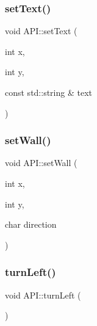 \mbox{\label{class_a_p_i_a25a489520b0b69b7a0b1870cf350f654}} 
\subsubsection{\texorpdfstring{set\+Text()}{setText()}}
{\footnotesize\ttfamily void A\+P\+I\+::set\+Text (\begin{DoxyParamCaption}\item[{int}]{x,  }\item[{int}]{y,  }\item[{const std\+::string \&}]{text }\end{DoxyParamCaption})\hspace{0.3cm}{\ttfamily [static]}}

\mbox{\label{class_a_p_i_a9b0b04cf1cfc62ae6f5eef1ac1729eb2}} 
\subsubsection{\texorpdfstring{set\+Wall()}{setWall()}}
{\footnotesize\ttfamily void A\+P\+I\+::set\+Wall (\begin{DoxyParamCaption}\item[{int}]{x,  }\item[{int}]{y,  }\item[{char}]{direction }\end{DoxyParamCaption})\hspace{0.3cm}{\ttfamily [static]}}

\mbox{\label{class_a_p_i_af04ee9209026f2a6e1c502e6c900573f}} 
\subsubsection{\texorpdfstring{turn\+Left()}{turnLeft()}}
{\footnotesize\ttfamily void A\+P\+I\+::turn\+Left (\begin{DoxyParamCaption}{ }\end{DoxyParamCaption})\hspace{0.3cm}{\ttfamily [static]}}

\mbox{\label{class_a_p_i_a4b5aaf5e3e061474d84191ab9ee05d63}} 

